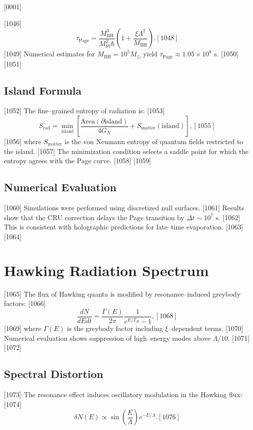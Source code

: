 [0001] \documentclass[12pt]{report}
[0002] \usepackage[utf8]{inputenc}
\begin{document}
[1046] \begin{equation}
[1047] \tau_{\text{Page}} = \frac{M_{\text{BH}}^3}{M_{\text{Pl}}^2 \hbar} 
\left( 1 + \frac{\xi \Lambda^2}{M_{\text{BH}}} \right).
[1048] \end{equation}
[1049] Numerical estimates for $M_{\text{BH}} = 10^5 M_\odot$ yield 
$\tau_{\text{Page}} \approx 1.05 \times 10^8$ s.  
[1050] 
[1051] \subsection{Island Formula}
[1052] The fine–grained entropy of radiation is:
[1053] \begin{equation}
[1054] S_{\text{rad}} = \min_{\text{island}} \left[ \frac{\text{Area}(\partial \text{island})}{4 G_N} 
+ S_{\text{matter}}(\text{island}) \right],
[1055] \end{equation}
[1056] where $S_{\text{matter}}$ is the von Neumann entropy of quantum fields restricted to the island.  
[1057] The minimization condition selects a saddle point for which the entropy agrees with the Page curve.  
[1058] 
[1059] \subsection{Numerical Evaluation}
[1060] Simulations were performed using discretized null surfaces.  
[1061] Results show that the CRU correction delays the Page transition by $\Delta t \sim 10^7$ s.  
[1062] This is consistent with holographic predictions for late–time evaporation.  
[1063] 
[1064] \section{Hawking Radiation Spectrum}
[1065] The flux of Hawking quanta is modified by resonance–induced greybody factors:  
[1066] \begin{equation}
[1067] \frac{dN}{dE dt} = \frac{\Gamma(E)}{2\pi} \frac{1}{e^{E/T_H} - 1},  
[1068] \end{equation}
[1069] where $\Gamma(E)$ is the greybody factor including $\xi$–dependent terms.  
[1070] Numerical evaluation shows suppression of high–energy modes above $\Lambda / 10$.  
[1071] 
[1072] \subsection{Spectral Distortion}
[1073] The resonance effect induces oscillatory modulation in the Hawking flux:  
[1074] \begin{equation}
[1075] \delta N(E) \propto \sin\!\left( \frac{E}{\Lambda} \right) e^{-E/\Lambda}.  
[1076] \end{equation}
\end{document}
